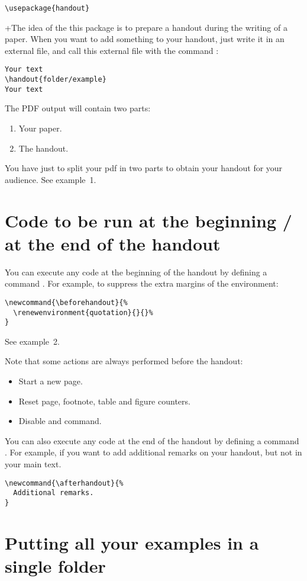 \documentclass{ltxdockit}[2011/03/25]
\begin{document}
\begin{verbatim}
\usepackage{handout}
\end{verbatim}
+The idea of the this package is to prepare a handout during the writing of a paper. When you want to add something to your handout, just write it in an external file, and call this external file with the command :

\begin{verbatim}
Your text
\handout{folder/example}
Your text
\end{verbatim}

The PDF output will contain two parts:
\begin{enumerate}
  \item Your paper.
  \item The handout.
\end{enumerate}

You have just to split your pdf in two parts to obtain your handout for your audience.
See example~1.

\section{Code to be run at the beginning / at the end of the handout}

You can execute any code at the beginning of the handout by defining a command . For example, to suppress the extra margins of the  environment:
\begin{verbatim}
\newcommand{\beforehandout}{%
  \renewenvironment{quotation}{}{}%
}
\end{verbatim}
See example~2.

Note that some actions are always performed before the handout:
\begin{itemize}
  \item Start a new page.
  \item Reset page,  footnote, table and figure counters.
  \item Disable  and  command.
\end{itemize}

You can also execute any code at the end of the handout by defining a command .
 For example, if you want to add additional remarks on your handout, but not in your main text.
\begin{verbatim}
\newcommand{\afterhandout}{%
  Additional remarks.
}
\end{verbatim}
\section{Putting all your examples in a single folder}
\end{document}
